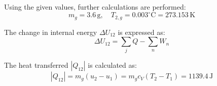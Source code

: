 Using the given values, further calculations are performed:  
\[
m_g = 3.6 \, \text{g}, \quad T_{2,g} = 0.003^\circ\text{C} = 273.153 \, \text{K}
\]  

The change in internal energy \( \Delta U_{12} \) is expressed as:  
\[
\Delta U_{12} = \sum_j Q - \sum_n W_n
\]  

The heat transferred \( |Q_{12}| \) is calculated as:  
\[
|Q_{12}| = m_g (u_2 - u_1) = m_g c_V (T_2 - T_1) = 1139.4 \, \text{J}
\]